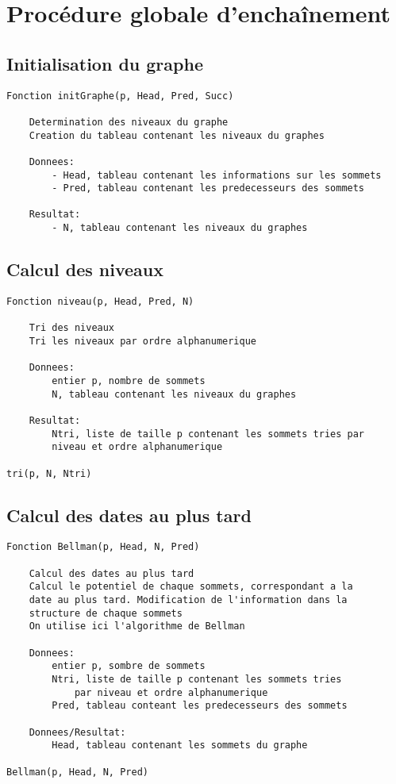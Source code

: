 \documentclass{article}
\begin{document}
\section{Procédure globale d’enchaînement}

\subsection{Initialisation du graphe}

\begin{lstlisting}
Fonction initGraphe(p, Head, Pred, Succ)

	Determination des niveaux du graphe
	Creation du tableau contenant les niveaux du graphes

	Donnees:
		- Head, tableau contenant les informations sur les sommets
		- Pred, tableau contenant les predecesseurs des sommets

	Resultat: 
		- N, tableau contenant les niveaux du graphes

\end{lstlisting}

\subsection{Calcul des niveaux}

\begin{lstlisting}
Fonction niveau(p, Head, Pred, N)

	Tri des niveaux
	Tri les niveaux par ordre alphanumerique

	Donnees:
		entier p, nombre de sommets
		N, tableau contenant les niveaux du graphes

	Resultat: 
		Ntri, liste de taille p contenant les sommets tries par 
		niveau et ordre alphanumerique

tri(p, N, Ntri)

\end{lstlisting}

\subsection{Calcul des dates au plus tard}

\begin{lstlisting}
Fonction Bellman(p, Head, N, Pred)

	Calcul des dates au plus tard
	Calcul le potentiel de chaque sommets, correspondant a la 
	date au plus tard. Modification de l'information dans la 
	structure de chaque sommets
	On utilise ici l'algorithme de Bellman
	
	Donnees:
		entier p, sombre de sommets
		Ntri, liste de taille p contenant les sommets tries 
			par niveau et ordre alphanumerique
		Pred, tableau conteant les predecesseurs des sommets

	Donnees/Resultat:
		Head, tableau contenant les sommets du graphe

Bellman(p, Head, N, Pred)

\end{lstlisting}
\end{document}
